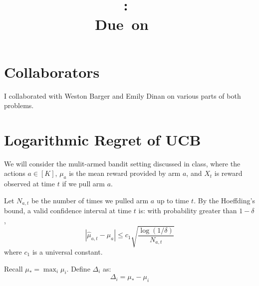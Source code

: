 \documentclass{article}
\title{
    \vspace{2in}
    \textmd{\textbf{\hmwkClass:\ \hmwkTitle}}\\
    \normalsize\vspace{0.1in}\small{Due\ on\ \hmwkDueDate\ }\\
    \vspace{3in}
}
\author{\textbf{\hmwkAuthorName}}
\date{}
\begin{document}
\maketitle
\pagebreak

\section*{Collaborators}
I collaborated with Weston Barger and Emily Dinan on various parts of both problems.


\section{Logarithmic Regret of UCB}


We will consider the mulit-armed bandit setting discussed in class, where the actions $a \in [K]$, $\mu_a$ is the mean reward provided by arm $a$, and $X_t$ is reward observed at time $t$ if we pull arm $a$.

Let $N_{a,t}$ be the number of times we pulled arm $a$ up to time $t$. By the Hoeffding's bound, a valid confidence interval at time $t$ is: with probability greater than $1-\delta$,
\[
	| \hat \mu_{a,t} - \mu_a | \leq c_1 \sqrt{\frac{\log(1/\delta)}{N_{a,t}}}
\]
where $c_1$ is a universal constant.

Recall $\mu_*=\max_i \mu_i$. Define $\Delta_i$ as:
\[
	\Delta_i = \mu_* - \mu_i 
\]
\end{document}
